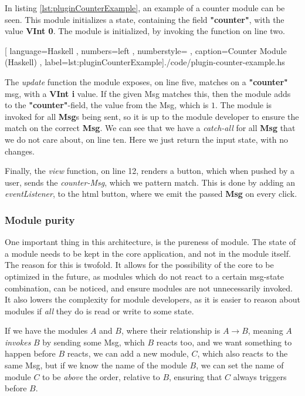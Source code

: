 In listing \ref{lst:pluginCounterExample}, an example of a counter module can be
seen. This module initializes a state, containing the field \textbf{"counter"},
with the value \textbf{VInt 0}. The module is initialized, by invoking the
function on line two.

\begin{center}
  
    [ language=Haskell
    , numbers=left
    , numberstyle=\tiny\color{gray}
    , caption={Counter Module (Haskell)}
    , label=lst:pluginCounterExample]{./code/plugin-counter-example.hs}
\end{center}

The \textit{update} function the module exposes, on line five, matches on a
\textbf{"counter"} msg, with a \textbf{VInt i} value. If the given Msg matches
this, then the module adds to the \textbf{"counter"}-field, the value from the
Msg, which is $1$. The module is invoked for all \textbf{Msg}s being sent, so it
is up to the module developer to ensure the match on the correct
\textbf{Msg}. We can see that we have a \textit{catch-all} for all \textbf{Msg}
that we do not care about, on line ten. Here we just return the input state,
with no changes.

Finally, the \textit{view} function, on line 12, renders a button, which when pushed by a
user, sends the \textit{counter-Msg}, which we pattern match. This is done by
adding an \textit{eventListener}, to the \gls*{html} button, where we emit the
passed \textbf{Msg} on every click.


\subsubsection{Module purity}

One important thing in this architecture, is the pureness of module. The state
of a module needs to be kept in the core application, and not in the module
itself. The reason for this is twofold. It allows for the possibility of the
core to be optimized in the future, as modules which do not react to a certain
msg-state combination, can be noticed, and ensure modules are not unnecessarily
invoked. It also lowers the complexity for module developers, as it is easier to
reason about modules if \textit{all} they do is read or write to some state.

If we have the modules $A$ and $B$, where their relationship is $A \to B$,
meaning $A$ \textit{invokes} $B$ by sending some Msg, which $B$ reacts too, and
we want something to happen before $B$ reacts, we can add a new module, $C$,
which also reacts to the same Msg, but if we know the name of the module $B$,
we can set the name of module $C$ to be \textit{above} the order, relative to
$B$, ensuring that $C$ always triggers before $B$.


